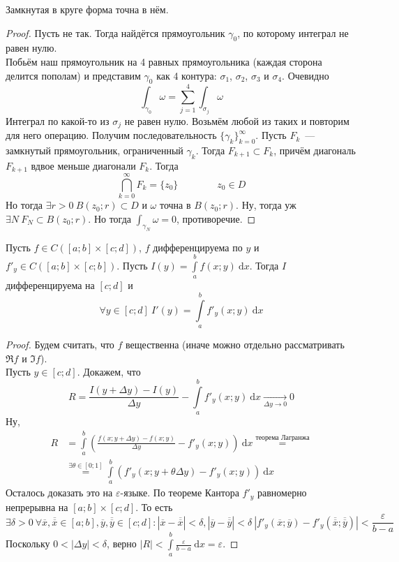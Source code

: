 \documentclass{article}
\let\eps\varepsilon
\begin{document}
    \begin{theorem}
        \label{Замкнутая в круге форма точна}
        Замкнутая в круге форма точна в нём.
    \end{theorem}
    \begin{proof}
        Пусть не так. Тогда найдётся прямоугольник $\gamma_0$, по которому интеграл не равен нулю.\\
        Побьём наш прямоугольник на 4 равных прямоугольника (каждая сторона делится пополам) и представим $\gamma_0$ как 4 контура: $\sigma_1$, $\sigma_2$, $\sigma_3$ и $\sigma_4$. Очевидно
        $$
        \int_{\gamma_0}\omega=\sum\limits_{j=1}^4\int_{\sigma_j}\omega
        $$
        Интеграл по какой-то из $\sigma_j$ не равен нулю. Возьмём любой из таких и повторим для него операцию. Получим последовательность $\{\gamma_k\}_{k=0}^\infty$. Пусть $F_k$~--- замкнутый прямоугольник, ограниченный $\gamma_k$. Тогда $F_{k+1}\subset F_k$, причём диагональ $F_{k+1}$ вдвое меньше диагонали $F_k$. Тогда
        $$\bigcap\limits_{k=0}^\infty F_k=\{z_0\}\qquad\qquad z_0\in D$$
        Но тогда $\exists r>0~B(z_0;r)\subset D$ и $\omega$ точна в $B(z_0;r)$. Ну, тогда уж $\exists N~F_N\subset B(z_0;r)$. Но тогда $\int_{\gamma_N}\omega=0$, противоречие.
    \end{proof}
    \begin{lemma}
        \label{Правило Лейбница дифференцирования интеграла по параметру}
        Пусть $f\in C([a;b]\times[c;d])$, $f$ дифференцируема по $y$ и $f'_y\in C([a;b]\times[c;b])$. Пусть $I(y)=\int\limits_a^bf(x;y)~\mathrm dx$. Тогда $I$ дифференцируема на $[c;d]$ и
        $$\forall y\in[c;d]~I'(y)=\int\limits_a^bf'_y(x;y)~\mathrm dx$$
    \end{lemma}
    \begin{proof}
        Будем считать, что $f$ вещественна (иначе можно отдельно рассматривать $\Re f$ и $\Im f$).\\
        Пусть $y\in[c;d]$. Докажем, что
        $$
        R=\frac{I(y+\Delta y)-I(y)}{\Delta y}-\int\limits_a^b f'_y(x;y)~\mathrm dx\underset{\Delta y\to0}\longrightarrow0
        $$
        Ну,
        \[
        \begin{split}
            R&=\int\limits_a^b\left(\frac{f(x;y+\Delta y)-f(x;y)}{\Delta y}-f'_y(x;y)\right)~\mathrm dx\overset{\text{теорема Лагранжа}}=\\
            &\overset{\exists\theta\in[0;1]}=\int\limits_a^b\left(f'_y(x;y+\theta\Delta y)-f'_y(x;y)\right)~\mathrm dx
        \end{split}
        \]
        Осталось доказать это на $\eps$-языке. По теореме Кантора $f'_y$ равномерно непрерывна на $[a;b]\times[c;d]$. То есть
        $$
        \exists\delta>0~\forall \overline x,\overline{\overline x}\in[a;b],\overline y,\overline{\overline y}\in[c;d]:|\overline x-\overline{\overline x}|<\delta,|\overline y-\overline{\overline y}|<\delta~|f'_y(\overline x;\overline y)-f'_y(\overline{\overline x};\overline{\overline y})|<\frac\eps{b-a}
        $$
        Поскольку $0<|\Delta y|<\delta$, верно $|R|<\int\limits_a^b\frac\eps{b-a}~\mathrm dx=\eps$.
    \end{proof}
\end{document}
